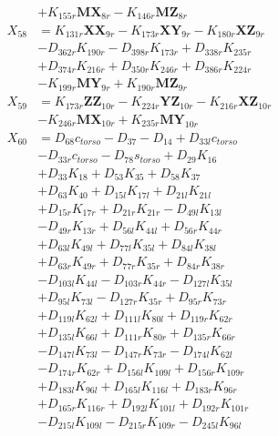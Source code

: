 \begin{multicols}{2}
\begin{align}
&+ K_{155r}\mathbf{MX}_{8r} - K_{146r}\mathbf{MZ}_{8r} \nonumber \\
X_{58} &= K_{131r}\mathbf{XX}_{9r} - K_{173r}\mathbf{XY}_{9r} - K_{180r}\mathbf{XZ}_{9r}  \nonumber \\
&- D_{362r}K_{190r} - D_{398r}K_{173r} + D_{338r}K_{235r}  \nonumber \\
&+ D_{374r}K_{216r} + D_{350r}K_{246r} + D_{386r}K_{224r}  \nonumber \\
&- K_{199r}\mathbf{MY}_{9r} + K_{190r}\mathbf{MZ}_{9r} \nonumber \\
X_{59} &= K_{173r}\mathbf{ZZ}_{10r} - K_{224r}\mathbf{YZ}_{10r} - K_{216r}\mathbf{XZ}_{10r}  \nonumber \\
&- K_{246r}\mathbf{MX}_{10r} + K_{235r}\mathbf{MY}_{10r} \nonumber \\
X_{60} &= D_{68}c_{torso} - D_{37} - D_{14} + D_{33l}c_{torso}  \nonumber \\
&- D_{33r}c_{torso} - D_{78}s_{torso} + D_{29}K_{16}  \nonumber \\
&+ D_{33}K_{18} + D_{53}K_{35} + D_{58}K_{37}  \nonumber \\
&+ D_{63}K_{40} + D_{15l}K_{17l} + D_{21l}K_{21l}  \nonumber \\
&+ D_{15r}K_{17r} + D_{21r}K_{21r} - D_{49l}K_{13l}  \nonumber \\
&- D_{49r}K_{13r} + D_{56l}K_{44l} + D_{56r}K_{44r}  \nonumber \\
&+ D_{63l}K_{49l} + D_{77l}K_{35l} + D_{84l}K_{38l}  \nonumber \\
&+ D_{63r}K_{49r} + D_{77r}K_{35r} + D_{84r}K_{38r}  \nonumber \\
&- D_{103l}K_{44l} - D_{103r}K_{44r} - D_{127l}K_{35l}  \nonumber \\
&+ D_{95l}K_{73l} - D_{127r}K_{35r} + D_{95r}K_{73r}  \nonumber \\
&+ D_{119l}K_{62l} + D_{111l}K_{80l} + D_{119r}K_{62r}  \nonumber \\
&+ D_{135l}K_{66l} + D_{111r}K_{80r} + D_{135r}K_{66r}  \nonumber \\
&- D_{147l}K_{73l} - D_{147r}K_{73r} - D_{174l}K_{62l}  \nonumber \\
&- D_{174r}K_{62r} + D_{156l}K_{109l} + D_{156r}K_{109r}  \nonumber \\
&+ D_{183l}K_{96l} + D_{165l}K_{116l} + D_{183r}K_{96r}  \nonumber \\
&+ D_{165r}K_{116r} + D_{192l}K_{101l} + D_{192r}K_{101r}  \nonumber \\
&- D_{215l}K_{109l} - D_{215r}K_{109r} - D_{245l}K_{96l}  \nonumber \\

\end{align}
\end{multicols}
